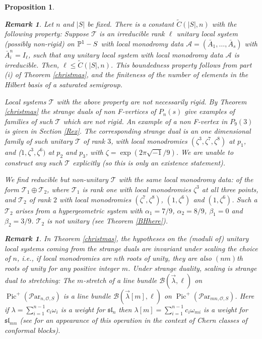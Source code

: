 \documentclass[11pt]{amsart}
\newcommand\Pic{\operatorname{Pic}}
\newcommand\mt{\mathcal{T}}
\newcommand\Par{\mathcal{P}\text{ar} }
\newtheorem{remark}[theorem]{ Remark}
\newtheorem{proposition}[theorem]{Proposition}
\numberwithin{theorem}{subsection}
\begin{document}
{\begin{proposition}
\begin{remark}\label{Hilberty} Let $n$ and $|S|$ be fixed.  There is a constant $\tilde{C}(|S|,n)$ with the following property:
 Suppose $\mathcal{T}$ is an irreducible  rank $\ell$ unitary local system (possibly non-rigid) on $\Bbb{P}^1-S$ with local monodromy data $\mathcal{A}=(\bar{A}_1,\dots,\bar{A}_s)$ with $\bar{A}_i^n=I_{\ell}$, such that any unitary local system with local monodromy data $\mathcal{A}$ is irreducible. Then, $\ell\leq \tilde{C}(|S|,n)$. This boundedness property follows from part (i) of Theorem \ref{christmas}, and the finiteness  of the number of elements in the Hilbert basis of a saturated semigroup.

Local systems  $\mathcal{T}$ with the  above property are not necessarily rigid. By Theorem \ref{christmas} the strange duals of non F-vertices of $P_n(s)$ give examples of families of such $\mt$ which are not rigid.  An example of a non F-vertex in $P_9(3)$ is given in Section \ref{Rex}. The corresponding strange dual is an one dimensional family of such unitary $\mt$ of rank $3$, with local monodromies $(\zeta^3,\zeta^7,\zeta^8)$ at $p_1$, and ($1,\zeta^3,\zeta^6)$ at $p_2$ and $p_3$, with $\zeta=\exp(2\pi\sqrt{-1}/9)$.  We are unable to construct any such $\mt$ explicitly (so this is only an existence statement).

We find reducible but non-unitary $\mt$ with the same local monodromy data: of the form $\mt_1\oplus\mt_2$, where $\mt_1$ is rank one with local monodromies $\zeta^3$ at all three points, and $\mt_2$ of rank $2$ with local monodromies $(\zeta^7,\zeta^8)$, $(1,\zeta^6)$ and $(1,\zeta^6)$. Such a $\mt_2$ arises from a hypergeometric system with $\alpha_1=7/9$, $\alpha_2=8/9$, $\beta_1=0$ and $\beta_2=3/9$. $\mt_2$ is not unitary (see Theorem \ref{BHhere}).

\end{remark}
\begin{remark}\label{stretch2}
In Theorem \ref{christmas}, the hypotheses on the (moduli of) unitary local systems coming from the strange duals are invariant under scaling the choice of $n$, i.e., if local monodromies are $n$th roots of unity, they are also $(nm)$th roots of unity for any positive integer $m$. Under strange duality, scaling is strange dual to stretching: The $m$-stretch of a line bundle
$\mathcal{B}(\vec{\lambda},\ell)$ on  $\Pic^+(\Par_{n,\mathcal{O},S})$ is a line bundle $\mathcal{B}(\vec{\lambda}[m],\ell)$ on  $\Pic^+(\Par_{mn,\mathcal{O},S})$. Here if $\lambda=\sum_{i=1}^{n-1}  c_i\omega_i$ is a weight for $\mathfrak{sl}_n$ then $\lambda[m] = \sum_{i=1}^{n-1}  c_i\omega_{mi}$ is a weight for $\mathfrak{sl}_{mn}$  (see \cite[Prop 1.3]{GG} for an appearance of this operation in the context of Chern classes of conformal blocks).


\end{remark}
\end{proposition}}
\end{document}
